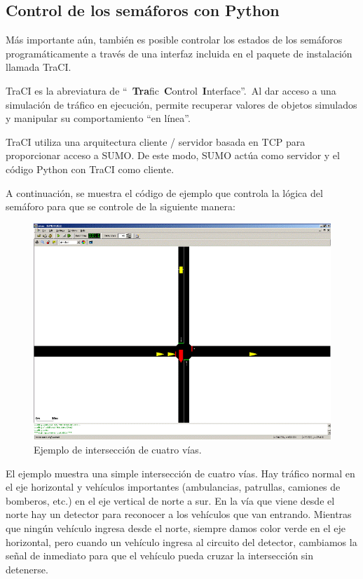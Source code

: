 \hypertarget{control-de-los-semuxe1foros-con-python}{%
\subsection{Control de los semáforos con
Python}\label{control-de-los-semuxe1foros-con-python}}

Más importante aún, también es posible controlar los estados de los
semáforos programáticamente a través de una interfaz incluida en el
paquete de instalación llamada TraCI.

TraCI es la abreviatura de
``~\textbf{Tra}fic~\textbf{C}ontrol~\textbf{I}nterface''.~Al dar acceso
a una simulación de tráfico en ejecución, permite recuperar valores de
objetos simulados y manipular su comportamiento ``en línea''.

TraCI utiliza una arquitectura cliente / servidor basada en TCP para
proporcionar acceso a SUMO. De este modo, SUMO actúa como servidor y el
código Python con TraCI como cliente.

A continuación, se muestra el código de ejemplo que controla la lógica
del semáforo para que se controle de la siguiente manera:

\begin{figure}[H]
    \centering
\includegraphics[width=\textwidth]{sumo/3a9d001be95c93c93c1c13ed9aeb7b26.png}
    \caption{Ejemplo de intersección de cuatro vías.}
    \label{fig:sumogui3}
\end{figure}

El ejemplo muestra una simple intersección de cuatro vías. Hay tráfico
normal en el eje horizontal y vehículos importantes (ambulancias,
patrullas, camiones de bomberos, etc.) en el eje vertical de norte a
sur. En la vía que viene desde el norte hay un detector para reconocer a
los vehículos que van entrando. Mientras que ningún vehículo ingresa
desde el norte, siempre damos color verde en el eje horizontal, pero
cuando un vehículo ingresa al circuito del detector, cambiamos la señal
de inmediato para que el vehículo pueda cruzar la intersección sin
detenerse.

